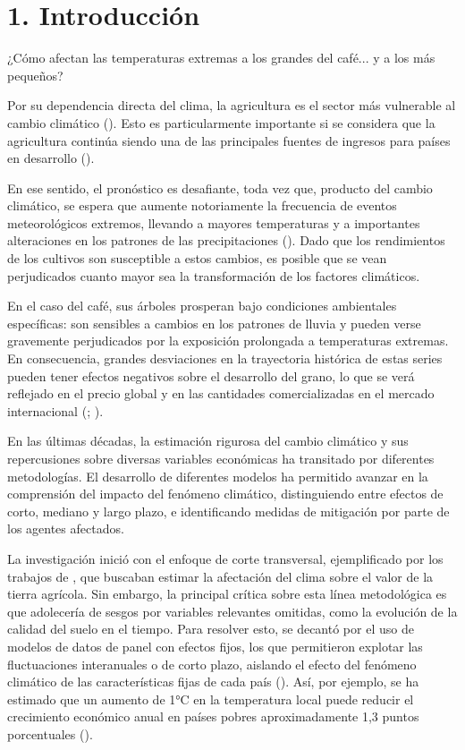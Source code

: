 \chapter*{1. Introducción}

¿Cómo afectan las temperaturas extremas a los grandes del café... y a los más pequeños? 

Por su dependencia directa del clima, la agricultura es el sector más vulnerable al cambio climático (\cite{FisherEtAl2012}). Esto es particularmente importante si se considera que la agricultura continúa siendo una de las principales fuentes de ingresos para países en desarrollo (\cite{ICO2009ClimateCoffee}).

En ese sentido, el pronóstico es desafiante, toda vez que, producto del cambio climático, se espera que aumente notoriamente la frecuencia de eventos meteorológicos extremos, llevando a mayores temperaturas y a importantes alteraciones en los patrones de las precipitaciones (\cite{MideksaKallbekken2010}). Dado que los rendimientos de los cultivos son susceptible a estos cambios, es posible que se vean perjudicados cuanto mayor sea la transformación de los factores climáticos.

En el caso del café, sus árboles prosperan bajo condiciones ambientales específicas: son sensibles a cambios en los patrones de lluvia y pueden verse gravemente perjudicados por la exposición prolongada a temperaturas extremas. En consecuencia, grandes desviaciones en la trayectoria histórica de estas series pueden tener efectos negativos sobre el desarrollo del grano, lo que se verá reflejado en el precio global y en las cantidades comercializadas en el mercado internacional (\cite{ICO2009ClimateCoffee}; \cite{covindassamy2017sugar}).

En las últimas décadas, la estimación rigurosa del cambio climático y sus repercusiones sobre diversas variables económicas ha transitado por diferentes metodologías. El desarrollo de diferentes modelos ha permitido avanzar en la comprensión del impacto del fenómeno climático, distinguiendo entre efectos de corto, mediano y largo plazo, e identificando medidas de mitigación por parte de los agentes afectados.

La investigación inició con el enfoque de corte transversal, ejemplificado por los trabajos de \cite{MendelsohnNordhausShaw1994}, que buscaban estimar la afectación del clima sobre el valor de la tierra agrícola. Sin embargo, la principal crítica sobre esta línea metodológica es que adolecería de sesgos por variables relevantes omitidas, como la evolución de la calidad del suelo en el tiempo. Para resolver esto, se decantó por el uso de modelos de datos de panel con efectos fijos, los que permitieron explotar las fluctuaciones interanuales o de corto plazo, aislando el efecto del fenómeno climático de las características fijas de cada país (\cite{DeschenesGreenstone2007}). Así, por ejemplo, se ha estimado que un aumento de 1°C en la temperatura local puede reducir el crecimiento económico anual en países pobres aproximadamente 1,3 puntos porcentuales (\cite{bilal2024macroeconomic}).

